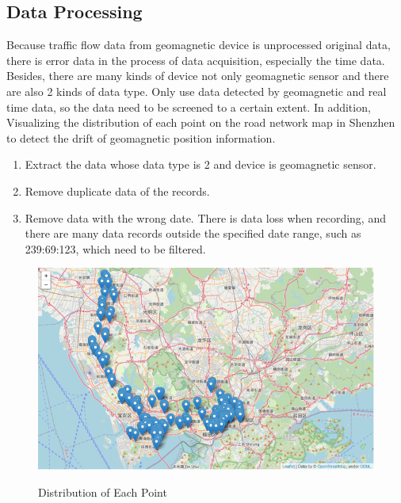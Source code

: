 \documentclass[fontset=none]{ctexart}
\theoremstyle{definition}
\theoremstyle{remark}
\begin{document}
\subsection{Data Processing}
Because traffic flow data from geomagnetic device is unprocessed original data, there is error data in the process of data acquisition, especially the time data. Besides, there are many kinds of device not only geomagnetic sensor and there are also 2 kinds of data type. Only use data detected by geomagnetic and real time data, so the data need to be screened to a certain extent. In addition, Visualizing the distribution of each point on the road network map in Shenzhen to detect the drift of geomagnetic position information.
\begin{enumerate}
  \item Extract the data whose data type is 2 and device is geomagnetic sensor.
  \item Remove duplicate data of the records.
  \item Remove data with the wrong date. There is data loss when recording, and there are many data records outside the specified date range, such as 239:69:123, which need to be filtered.
\end{enumerate}
\begin{figure}[htb]
  \centering
  \includegraphics[width=\textwidth]{images/7-3-2.png}
  \label{fig: 732}
  \caption{Distribution of Each Point}
\end{figure}
\end{document}
